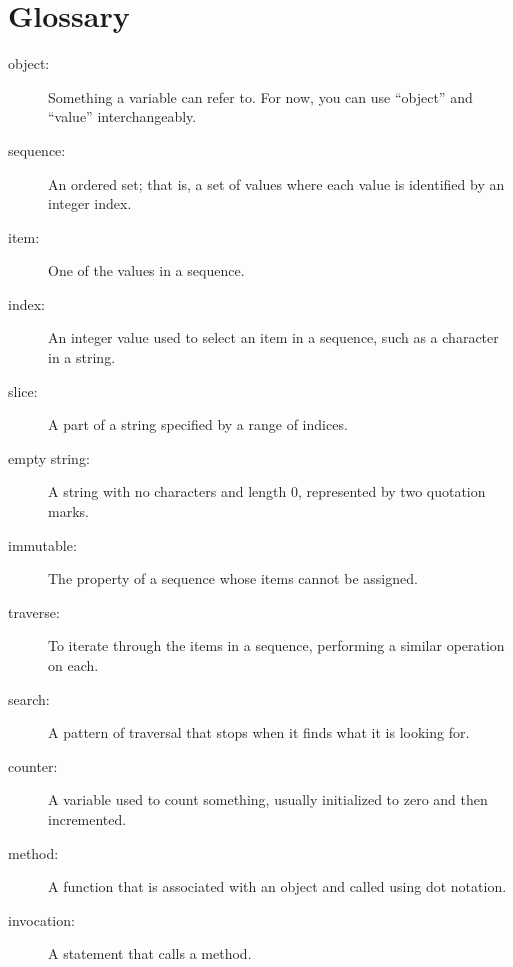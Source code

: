 \documentclass[10pt]{book}
\begin{document}
\section{Glossary}

\begin{description}

\item[object:] Something a variable can refer to.  For now,
you can use ``object'' and ``value'' interchangeably.

\item[sequence:] An ordered set; that is, a set of
values where each value is identified by an integer index.

\item[item:] One of the values in a sequence.

\item[index:] An integer value used to select an item in
a sequence, such as a character in a string.

\item[slice:] A part of a string specified by a range of indices.

\item[empty string:] A string with no characters and length 0, represented
by two quotation marks.

\item[immutable:] The property of a sequence whose items cannot
be assigned.

\item[traverse:] To iterate through the items in a sequence,
performing a similar operation on each.

\item[search:] A pattern of traversal that stops
when it finds what it is looking for.

\item[counter:] A variable used to count something, usually initialized
to zero and then incremented.

\item[method:] A function that is associated with an object and called
using dot notation.

\item[invocation:] A statement that calls a method.

\end{description}
\end{document}

